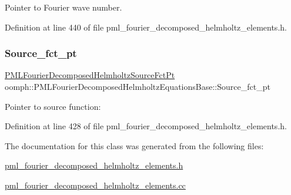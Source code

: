 Pointer to Fourier wave number. 



Definition at line 440 of file pml\+\_\+fourier\+\_\+decomposed\+\_\+helmholtz\+\_\+elements.\+h.

\mbox{\label{classoomph_1_1PMLFourierDecomposedHelmholtzEquationsBase_a3406c98c232de8cce1594e728748202d}} 
\subsubsection{\texorpdfstring{Source\+\_\+fct\+\_\+pt}{Source\_fct\_pt}}
{\footnotesize\ttfamily \hyperlink{classoomph_1_1PMLFourierDecomposedHelmholtzEquationsBase_a2e749d98392af2109b41dca0ae618b79}{P\+M\+L\+Fourier\+Decomposed\+Helmholtz\+Source\+Fct\+Pt} oomph\+::\+P\+M\+L\+Fourier\+Decomposed\+Helmholtz\+Equations\+Base\+::\+Source\+\_\+fct\+\_\+pt\hspace{0.3cm}{\ttfamily [protected]}}



Pointer to source function\+: 



Definition at line 428 of file pml\+\_\+fourier\+\_\+decomposed\+\_\+helmholtz\+\_\+elements.\+h.



The documentation for this class was generated from the following files\+:\begin{DoxyCompactItemize}
\item 
\hyperlink{pml__fourier__decomposed__helmholtz__elements_8h}{pml\+\_\+fourier\+\_\+decomposed\+\_\+helmholtz\+\_\+elements.\+h}\item 
\hyperlink{pml__fourier__decomposed__helmholtz__elements_8cc}{pml\+\_\+fourier\+\_\+decomposed\+\_\+helmholtz\+\_\+elements.\+cc}\end{DoxyCompactItemize}
